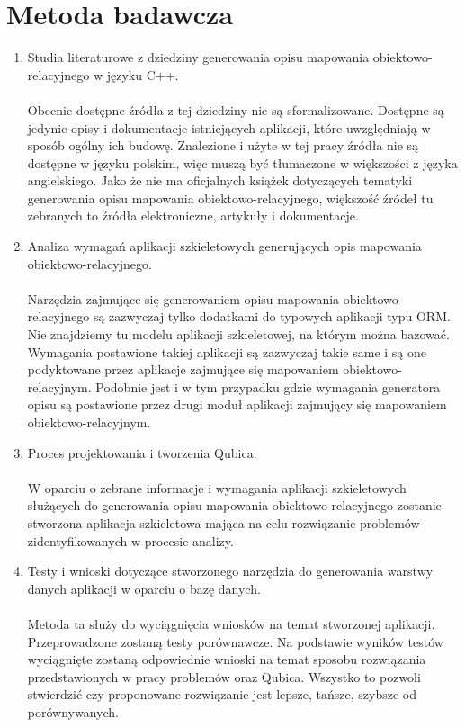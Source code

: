 \documentclass[12pt]{report}
\begin{document}
\section{Metoda badawcza}
\begin{enumerate}
\item Studia literaturowe z dziedziny generowania opisu mapowania obiektowo-relacyjnego w języku C++. \\ \\
Obecnie dostępne źródła z tej dziedziny nie są sformalizowane. Dostępne są jedynie opisy i dokumentacje istniejących aplikacji, które uwzględniają
w sposób ogólny ich budowę. Znalezione i użyte w tej pracy źródła nie są dostępne w języku polskim, więc muszą być tłumaczone w większości z języka angielskiego.
Jako że nie ma oficjalnych książek dotyczących tematyki generowania opisu mapowania obiektowo-relacyjnego, większość źródeł tu zebranych to źródła elektroniczne, artykuły i dokumentacje.
\item Analiza wymagań aplikacji szkieletowych generujących opis mapowania obiek\-towo-relacyjnego. \\ \\
Narzędzia zajmujące się generowaniem opisu mapowania obiektowo-relacyj\-nego są zazwyczaj tylko dodatkami do typowych aplikacji typu ORM. Nie znajdziemy tu
modelu aplikacji szkieletowej, na którym można bazować. Wymagania postawione takiej aplikacji są zazwyczaj takie same i są one podyktowane przez aplikacje zajmujące się mapowaniem obiektowo-relacyjnym. Podobnie jest i w tym przypadku gdzie wymagania generatora opisu są postawione przez drugi moduł aplikacji zajmujący się mapowaniem obiektowo-relacyjnym.
\item Proces projektowania i tworzenia Qubica. \\ \\
W oparciu o zebrane informacje i wymagania aplikacji szkieletowych służących do generowania opisu mapowania obiektowo-relacyjnego zostanie stworzona aplikacja szkieletowa mająca na celu rozwiązanie problemów zidentyfikowanych w procesie analizy.
\item Testy i wnioski dotyczące stworzonego narzędzia do generowania warstwy danych aplikacji w oparciu o bazę danych. \\ \\
Metoda ta służy do wyciągnięcia wniosków na temat stworzonej aplikacji. Przeprowadzone zostaną testy porównawcze. Na podstawie wyników testów wyciągnięte zostaną odpowiednie wnioski na temat sposobu rozwiązania przedstawionych w pracy problemów oraz Qubica. Wszystko to pozwoli stwierdzić czy proponowane rozwiązanie jest lepsze, tańsze, szybsze od porównywanych.

\end{enumerate}
\end{document}
